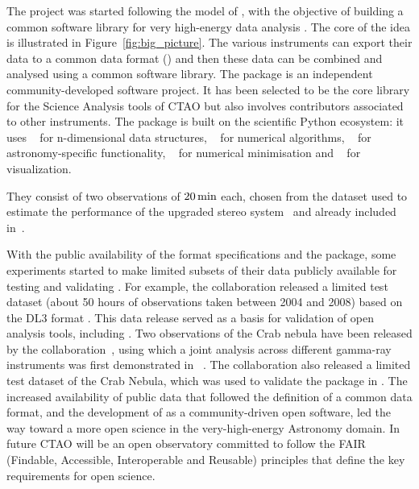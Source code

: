 \documentclass[longauth]{aa}
\begin{document}
The \gammapy project was started following the model of \astropy, with the objective of building a common
software library for very high-energy \gammaray data analysis \citep{gammapy_2015}. 
The core of the idea is illustrated in Figure~\ref{fig:big_picture}. The various \gammaray instruments
can export their data to a common data format (\gadf) and then these data can be combined and
analysed using a common software library.
The \gammapy package is an independent community-developed software project. It has been selected to be the core library for the Science Analysis tools of CTAO
but also involves contributors associated to other instruments.
The \gammapy package is built on the scientific Python ecosystem: it uses \numpy~\citep{numpy} for n-dimensional data
structures, \scipy~\citep{2020SciPy-NMeth} for numerical algorithms, \astropy~\citep{astropy} for
astronomy-specific functionality, \iminuit~\citep{iminuit} for numerical minimisation
and \matplotlib~\citep{matplotlib} for visualization.

They consist of two
observations of $20\,{\rm min}$ each, chosen from the dataset used to estimate
the performance of the upgraded stereo system~\citep{magic_performance} and
already included in~\cite{joint_crab}.

With the public availability of the \gadf format specifications and the
\gammapy package, some experiments started to make limited subsets of
their \gammaray data publicly available for testing and validating
\gammapy. For example, the \hess collaboration released a limited test
dataset (about 50 hours of observations taken between 2004 and 2008)
based on the \gadf DL3 format \citep{HESS_DR1}. This data release served
as a basis for validation of open analysis tools, including \gammapy 
\cite[see e.g.][]{Mohrmann2019}. Two observations of the Crab nebula have been
 released by the \magic collaboration~\citep{magic_performance}, using which a
joint analysis across different gamma-ray instruments was first demonstrated in ~\cite{joint_crab}.
The \hawc collaboration also released
a limited test dataset of the Crab Nebula, which was used to validate
the \gammapy package in \cite{Olivera2022}.
The increased availability of public data that followed the definition of
a common data format, and the development of \gammapy as a community-driven open software,
led the way toward a more open science in the very-high-energy \gammaray Astronomy domain.
In future CTAO will be an open observatory committed to follow the FAIR
(Findable, Accessible, Interoperable and Reusable) principles \citep{FAIR16, FAIR22} 
that define the key requirements for open science. 
\end{document}
